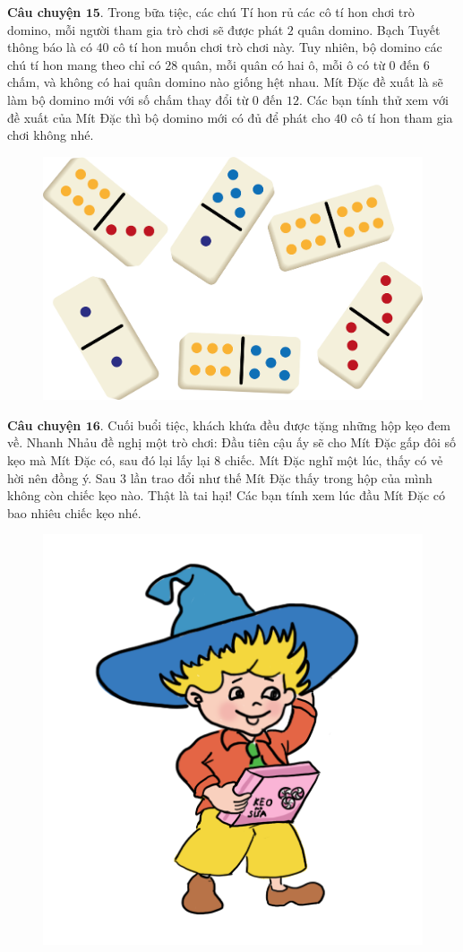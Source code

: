 	\textbf{\color{toancuabi}Câu chuyện $\pmb{15.}$} Trong bữa tiệc, các chú Tí hon rủ các cô tí hon chơi trò domino, mỗi người tham gia trò chơi sẽ được phát $2$ quân domino. Bạch Tuyết thông báo là có $40$ cô tí hon muốn chơi trò chơi này. Tuy nhiên, bộ domino các chú tí hon mang theo chỉ có $28$ quân, mỗi quân có hai ô, mỗi ô có từ $0$ đến $6$ chấm, và không có hai quân domino nào giống hệt nhau. Mít Đặc đề xuất là sẽ làm bộ domino mới với số chấm thay đổi từ $0$ đến $12$. Các bạn tính thử xem với đề xuất của Mít Đặc thì bộ domino mới có đủ để phát cho $40$ cô tí hon tham gia chơi không nhé.
	\begin{figure}[H]
		\centering
		\vspace*{-5pt}
		\captionsetup{labelformat= empty, justification=centering}
		\includegraphics[width=0.6\linewidth]{Hinh17_Domino}
		\vspace*{-10pt}
	\end{figure}
	\textbf{\color{toancuabi}Câu chuyện $\pmb{16.}$} Cuối buổi tiệc, khách khứa đều được tặng những hộp kẹo đem về. Nhanh Nhảu đề nghị một trò chơi: Đầu tiên cậu ấy sẽ cho Mít Đặc gấp đôi số kẹo mà Mít Đặc có, sau đó lại lấy lại $8$ chiếc. Mít Đặc nghĩ một lúc, thấy có vẻ hời nên đồng ý. Sau $3$ lần trao đổi như thế Mít Đặc thấy trong hộp của mình không còn chiếc kẹo nào. Thật là tai hại! Các bạn tính xem lúc đầu Mít Đặc có bao nhiêu chiếc kẹo nhé.
	\begin{figure}[H]
		\centering
		\vspace*{-5pt}
		\captionsetup{labelformat= empty, justification=centering}
		\includegraphics[width=0.4\linewidth]{Hinh18_MitDac}
		\vspace*{-10pt}
	\end{figure}
